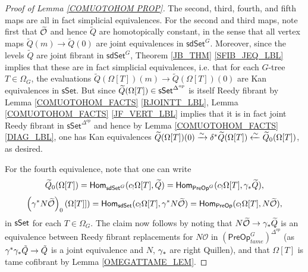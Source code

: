 \documentclass[a4paper,10pt
,draft
]{article}%
\renewcommand{\1}{\eta}%
\begin{document}
\begin{proof}[Proof of Lemma \ref{COMUOTOHOM PROP}]
      The second, third, fourth, and fifth maps are all in fact simplicial equivalences.
      For the second and third maps, note first that $\widetilde{\mathcal{O}}$ and hence
      $\widetilde{Q}$ are homotopically constant, in the sense that
      all vertex maps $\widetilde{Q}(m) \to \widetilde{Q}(0)$ are joint equivalences in $\mathsf{sdSet}^G$.
      Moreover, since the levels $\widetilde{Q}$ are joint fibrant in $\mathsf{sdSet}^G$,
      Theorem \ref{JB_THM} \ref{SFIB_JEQ_LBL} %
      implies that these are in fact simplicial equivalences, %
      i.e. that for each $G$-tree $T \in \Omega_G$, the evaluations %
      $\widetilde{Q}(\Omega[T])(m) \to \widetilde{Q}(\Omega[T])(0)$
      are Kan equivalences in $\mathsf{sSet}$.  %
      But since $\widetilde{Q}(\Omega[T]) \in \mathsf{sSet}^{\Delta^{op}}$ %
      is itself Reedy fibrant by
      Lemma \ref{COMUOTOHOM_FACTS} \ref{RJOINTT_LBL},
      Lemma \ref{COMUOTOHOM_FACTS} \ref{JF_VERT_LBL} %
      implies that it is in fact joint Reedy fibrant in $\mathsf{sSet}^{\Delta^{op}}$ %
      and hence by Lemma \ref{COMUOTOHOM_FACTS} \ref{DIAG_LBL}, %
      one has Kan equivalences %
      $\widetilde{Q}(\Omega[T])(0) \xrightarrow{\sim}
      \delta^{\**} \widetilde{Q}(\Omega[T]) \xleftarrow{\sim}
      \widetilde{Q}_0(\Omega[T])$, as desired.
      
      For the fourth equivalence, note that one can write
      \[
            \widetilde{Q}_0(\Omega[T]) = 
            \mathsf{Hom}_{\mathsf{sdSet}^G}(c_!\Omega[T],\widetilde{Q})=
            \mathsf{Hom}_{\mathsf{PreOp}^G}(c_!\Omega[T],\gamma_{\**}\widetilde{Q}),
      \] 
      \[
            \left(\gamma^{\**} N \widetilde{\mathcal{O}}\right)_0(\Omega[T]]) = 
            \mathsf{Hom}_{\mathsf{sdSet}}(c_!\Omega[T],\gamma^{\**} N \widetilde{\mathcal{O}})=
            \mathsf{Hom}_{\mathsf{PreOp}}(c_!\Omega[T], N \widetilde{\mathcal{O}}),
      \]
      in $\mathsf{sSet}$ for each $T \in \Omega_G$. %
      The claim now follows by noting that
      $N \widetilde{\mathcal{O}} \to \gamma_{\**} \widetilde{Q}$
      is an equivalence between Reedy fibrant replacements for $N \mathcal O$ in $(\mathsf{PreOp}^G_{tame})^{\Delta^{op}}$
      (as $\gamma^{\**}\gamma_{\**}\tilde Q \to \tilde Q$ is a joint equivalence and $N$, $\gamma_{\**}$ are right Quillen),
      and that $\Omega[T]$ is tame cofibrant by Lemma \ref{OMEGATTAME_LEM}.
      

\end{proof}
\end{document}
